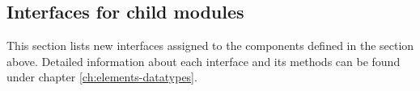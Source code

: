 


\subsection*{Interfaces for child modules}
    This section lists new interfaces assigned to the components defined
    in the section above. Detailed information about each interface and
    its methods can be found under chapter \ref{ch:elements-datatypes}.

